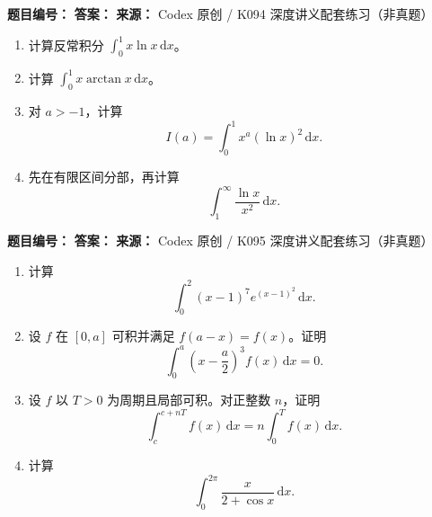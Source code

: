 \begin{problemBox}
\begin{problemMeta}
\textbf{题目编号：} \quad
\textbf{答案：} \quad
\textbf{来源：} Codex 原创 / K094 深度讲义配套练习（非真题）
\end{problemMeta}
\begin{enumerate}
  \item[\textbf{A}] 计算反常积分
  \(\displaystyle\int_0^1x\ln x\,\mathrm dx\)。
  \item[\textbf{B}] 计算
  \(\displaystyle\int_0^1x\arctan x\,\mathrm dx\)。
  \item[\textbf{C}] 对 \(a>-1\)，计算
  \[
  I(a)=\int_0^1x^a(\ln x)^2\,\mathrm dx.
  \]
  \item[\textbf{M}] 先在有限区间分部，再计算
  \[
  \int_1^\infty\frac{\ln x}{x^2}\,\mathrm dx.
  \]
\end{enumerate}
\end{problemBox}

\begin{problemBox}
\begin{problemMeta}
\textbf{题目编号：} \quad
\textbf{答案：} \quad
\textbf{来源：} Codex 原创 / K095 深度讲义配套练习（非真题）
\end{problemMeta}
\begin{enumerate}
  \item[\textbf{A}] 计算
  \[
  \int_0^2(x-1)^7e^{(x-1)^2}\,\mathrm dx.
  \]
  \item[\textbf{B}] 设 \(f\) 在 \([0,a]\) 可积并满足
  \(f(a-x)=f(x)\)。证明
  \[
  \int_0^a\left(x-\frac a2\right)^3f(x)\,\mathrm dx=0.
  \]
  \item[\textbf{C}] 设 \(f\) 以 \(T>0\) 为周期且局部可积。对正整数
  \(n\)，证明
  \[
  \int_c^{c+nT}f(x)\,\mathrm dx
  =n\int_0^Tf(x)\,\mathrm dx.
  \]
  \item[\textbf{M}] 计算
  \[
  \int_0^{2\pi}\frac{x}{2+\cos x}\,\mathrm dx.
  \]
\end{enumerate}
\end{problemBox}

